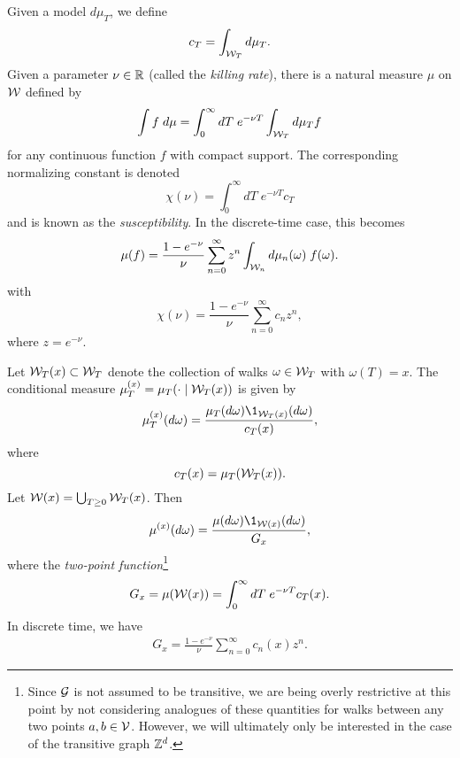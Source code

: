 Given a model $d\mu_T$, we define
\begin{equation}
c_T = \int_{\mathcal{W}_T} d\mu_T.
\end{equation}
Given a parameter $\nu \in {\mathbb R}$ (called the \emph{killing rate}),
there is a natural measure $\mu$ on $\mathcal{W}$ defined by
\begin{equation}
\int f \; d\mu
  =
\int_0^\infty dT \; e^{-\nu T} \int_{\mathcal{W}_T} d\mu_T f
\end{equation}
for any continuous function $f$ with compact support.
The corresponding normalizing constant is denoted
\begin{equation}
\chi(\nu) = \int_0^\infty dT \; e^{-\nu T} c_T
\end{equation}
and is known as the \emph{susceptibility}. In the discrete-time case, this becomes
\begin{equation}
\mu(f)
  =
\frac{1 - e^{-\nu}}{\nu} \sum_{n=0}^\infty z^n \int_{\mathcal{W}_n} d\mu_n(\omega) \; f(\omega).
\end{equation}
with
\begin{equation}
\chi(\nu) = \frac{1 - e^{-\nu}}{\nu} \sum_{n=0}^\infty c_n z^n,
\end{equation}
where $z = e^{-\nu}$.

Let $\mathcal{W}_T(x) \subset \mathcal{W}_T$ denote the collection of walks $\omega \in \mathcal{W}_T$
with $\omega(T) = x$. The conditional measure $\mu^{(x)}_T = \mu_T(\cdot \mid \mathcal{W}_T(x))$
is given by
\begin{equation}
\mu^{(x)}_T(d\omega) = \frac{\mu_T(d\omega) \1_{\Wcal_T(x)}(d\omega)}{c_T(x)},
\end{equation}
where
\begin{equation}
c_T(x) = \mu_T(\mathcal{W}_T(x)).
\end{equation}
Let $\mathcal{W}(x) = \bigcup_{T \ge 0} \mathcal{W}_T(x)$. Then
\begin{equation}
\mu^{(x)}(d\omega) = \frac{\mu(d\omega) \1_{\Wcal(x)}(d\omega)}{G_x},
\end{equation}
where the \emph{two-point function}\footnote{Since $\mathcal{G}$ is not assumed to be
transitive, we are being overly restrictive at this point by not considering analogues
of these quantities for
walks between any two points $a, b \in \mathcal{V}$. However, we will ultimately
only be interested in the case of the transitive graph ${ {{\mathbb Z}}^d }$.}
\begin{equation}
G_x = \mu(\mathcal{W}(x)) = \int_0^\infty dT \; e^{-\nu T} c_T(x).
\end{equation}
In discrete time, we have
\begin{align}
G_x = \frac{1 - e^{-\nu}}{\nu} \sum_{n=0}^\infty c_n(x) z^n.
\end{align}

